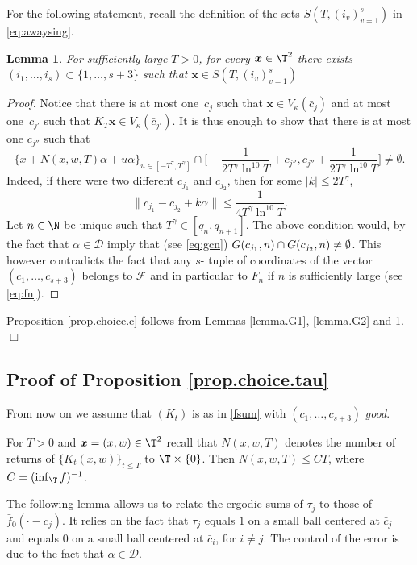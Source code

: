 \documentclass[10pt]{amsart}
\let\DS\relax
\newcommand\cD{\mathcal{D}}
\newcommand\cF{\mathcal{F}}
\newcommand\bx{\boldsymbol{x}}
\theoremstyle{definition}
\theoremstyle{plain}
\newtheorem{lemma}[definition]{Lemma}
\begin{document}
For the following statement, recall the definition of the sets $S(T,(i_v)_{v=1}^s)$ in \eqref{eq:awaysing}.
\begin{lemma}\label{lem:sep}
For sufficiently large $T>0$, for every $\bx\in \T^2$ there exists $(i_1,\ldots,i_s)\subset \{1,\ldots,s+3\}$ such that $\bx\in S(T,(i_v)_{v=1}^s)$
\end{lemma}

\begin{proof} Notice that there is at most one~$c_j$ such that $\bx\in V_\kappa(\bar{c}_j)$ and at most one~$c_{j'}$ such that ${K_T}\bx\in V_\kappa(\bar{c}_{j'})$. It is thus enough to show that there is at most one $c_{j''}$ such that
\[
\{x+N(x,w,T)\alpha+u\alpha\}_{u\in [-T^\gamma,T^\gamma]} \cap \Big[-\frac{1}{2T^\gamma\ln^{10}T}+ c_{j''}, c_{j''}+\frac{1}{2T^\gamma\ln^{10}T}\Big] \neq \emptyset.
\]
Indeed, if there were two different $c_{j_1}$ and $c_{j_2}$, then for some $|k|\leq 2T^\gamma$,
\[
\|c_{j_1}-c_{j_2}+k\alpha\|\leq \frac{1}{4T^\gamma\ln^{10}T}.
\]
Let $n\in \N$ be unique such that $T^\gamma \in [q_n,q_{n+1}]$. The above condition would, by the fact that $\alpha\in \cD$ imply that (see \eqref{eq:gcn})
$\DS
G(c_{j_1},n)\cap G(c_{j_2},n)\neq \emptyset$.
This however contradicts the fact that any $s$- tuple of coordinates of the vector $(c_1,\ldots, c_{s+3})$ belongs to $\cF$ and in particular to $F_n$ if $n$ is sufficiently large (see \eqref{eq:fn}).
\end{proof}

Proposition \ref{prop.choice.c} follows from Lemmas \ref{lemma.G1}, \ref{lemma.G2} and \ref{lem:sep}. \hfill $\Box$

\subsection{Proof of Proposition \ref{prop.choice.tau}}
\label{SSprop.choice.tau}

From now on we assume that $(K_t)$ is as in \eqref{fsum} with $(c_1,\ldots,c_{s+3})$ {\it good}.

For $T>0$ and $\bx=(x,w)\in \T^2$ recall that $N(x,w,T)$ denotes the number of returns of $\{K_t(x,w)\}_{t\leq T}$ to
$\T\times \{0\}$. Then $N(x,w,T)\leq C T$, where $C=(\inf_\T f)^{-1}$.

The following lemma allows us to relate the ergodic sums of $\tau_j$ to those of $\bar f_0(\cdot-c_j)$. It relies on the fact that $\tau_j$ equals $1$ on a small ball centered at $\bar{c}_j$ and equals $0$ on a small ball centered at $\bar{c}_i$, for $i\neq j$. The control of the error is due to the fact that $\alpha \in \cD$.
\end{document}

